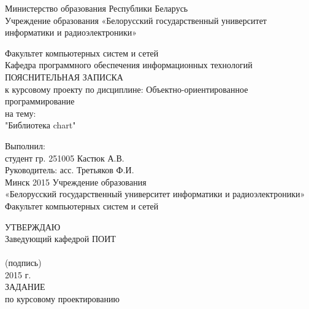 \documentclass[a4paper,14pt]{extreport}
\begin{document}
	\center
	Министерство образования Республики Беларусь\\
	Учреждение образования «Белорусский государственный университет информатики и радиоэлектроники»
	\vspace*{2cm}
	\endcenter
	\raggedright
	Факультет компьютерных систем и сетей\\
	\medskip
	Кафедра программного обеспечения информационных технологий\\
	\vspace*{2cm}
	\center
	ПОЯСНИТЕЛЬНАЯ ЗАПИСКА\\
	к курсовому проекту по дисциплине: Объектно-ориентированное программирование\\
	на тему:\\
	\medskip
	"Библиотека chart"\\
	\vspace*{4cm}
	\endcenter
	\raggedright
	\hspace*{7.94cm}Выполнил:\\
	\hspace*{7.94cm}студент гр. 251005 Кастюк А.В.\\
	\bigskip
	\hspace*{7.94cm}Руководитель: асс. Третьяков Ф.И.\\
	\center
	\vspace*{6cm}
	Минск 2015
	\pagestyle{empty}
	\newpage
	\center
	Учреждение образования\\
	\medskip
	«Белорусский государственный университет информатики и радиоэлектроники»\\
	\medskip
	Факультет компьютерных систем и сетей\\
	\medskip
	\endcenter
	\raggedright
	\hspace*{9.53cm}УТВЕРЖДАЮ\\
	\hspace*{9.53cm}Заведующий кафедрой ПОИТ\\
	\hspace*{9.53cm}\underline{\hspace{6cm}} \\
	\hspace*{11cm}\small (подпись) \normalsize\\
	\hspace*{9.53cm}\underline{\hspace{5cm}}2015 г.\\
	\medskip
	\center
	ЗАДАНИЕ\\
	по курсовому проектированию\\
\end{document}
